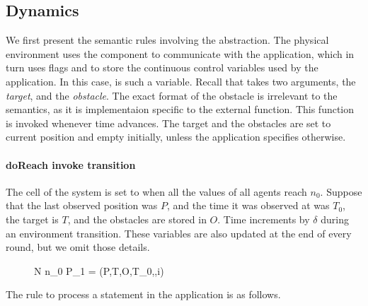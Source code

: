 \subsection{Dynamics}
\label{sect:dynamics}
We first present the semantic rules involving the  abstraction. The physical environment uses the  component to communicate with the application, which in turn uses flags  and  to store the continuous control variables used by the application. In this case,  is such a variable. Recall that  takes two arguments, the \emph{target}, and the \emph{obstacle}. The exact format of the obstacle is irrelevant to the semantics, as it is implementaion specific to the  external function. This function is invoked whenever time advances. The target and the obstacles are set to current position and empty initially, unless the application specifies otherwise. 

\paragraph{doReach invoke transition} The  cell of the system is set to  when all the  values of all agents reach $n_0$. Suppose that the last observed position was $P$, and the time it was observed at was $T_0$, the target is $T$, and the obstacles are stored in $O$. Time increments by $\delta$ during an environment transition. These variables are also updated at the end of every round, but we omit those details. 
%

\begin{figure}
\label{fig:doreach2}
{N  n_0  P_{1} = (P,T,O,T_0,\delta,i)}{}{}{}
\end{figure}



The rule to process a  statement  in the application is as follows. 

